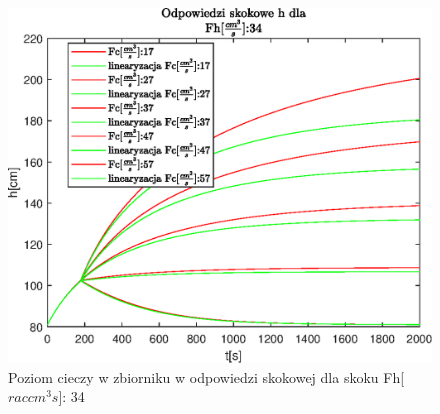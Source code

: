\begin{figure}[h!]
   \centering
   \includegraphics{img/step-responses/h/stepResponseHFh34.eps}
   \caption{Poziom cieczy w zbiorniku w odpowiedzi skokowej dla skoku Fh[$rac{cm^3}{s}$]: 34}
   \label{fig:stepResponseHFh34}
\end{figure}
            
